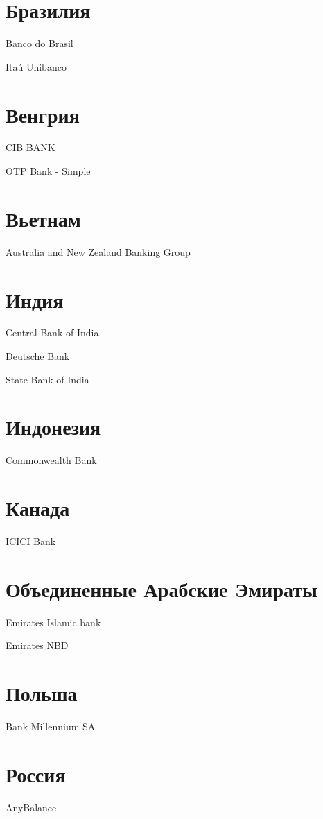 \documentclass[a4paper,10pt,russian]{sphinxmanual}
\begin{document}
\section{Бразилия}
\label{\detokenize{banks:id3}}
Banco do Brasil

Itaú Unibanco


\section{Венгрия}
\label{\detokenize{banks:id4}}
CIB BANK

OTP Bank - Simple


\section{Вьетнам}
\label{\detokenize{banks:id5}}
Australia and New Zealand Banking Group


\section{Индия}
\label{\detokenize{banks:id6}}
Central Bank of India

Deutsche Bank

State Bank of India


\section{Индонезия}
\label{\detokenize{banks:id7}}
Commonwealth Bank


\section{Канада}
\label{\detokenize{banks:id8}}
ICICI Bank


\section{Объединенные Арабские Эмираты}
\label{\detokenize{banks:id9}}
Emirates Islamic bank

Emirates NBD


\section{Польша}
\label{\detokenize{banks:id10}}
Bank Millennium SA


\section{Россия}
\label{\detokenize{banks:id11}}
AnyBalance
\end{document}
